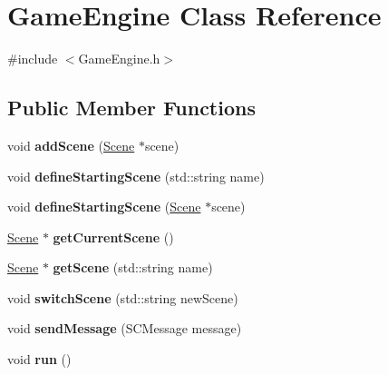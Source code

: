 \hypertarget{class_game_engine}{}\section{Game\+Engine Class Reference}
\label{class_game_engine}


{\ttfamily \#include $<$Game\+Engine.\+h$>$}

\subsection*{Public Member Functions}
\begin{DoxyCompactItemize}
\item 
\hypertarget{class_game_engine_a5505704cb9ba58c5d029d8a736eff73d}{}\label{class_game_engine_a5505704cb9ba58c5d029d8a736eff73d} 
void {\bfseries add\+Scene} (\hyperlink{class_scene}{Scene} $\ast$scene)
\item 
\hypertarget{class_game_engine_aba1c35007c56a3082102f67c08ea5580}{}\label{class_game_engine_aba1c35007c56a3082102f67c08ea5580} 
void {\bfseries define\+Starting\+Scene} (std\+::string name)
\item 
\hypertarget{class_game_engine_ad2bb379da2ce51978a989de4ca979ecb}{}\label{class_game_engine_ad2bb379da2ce51978a989de4ca979ecb} 
void {\bfseries define\+Starting\+Scene} (\hyperlink{class_scene}{Scene} $\ast$scene)
\item 
\hypertarget{class_game_engine_a8116aae790eaf236907d5d75401cd628}{}\label{class_game_engine_a8116aae790eaf236907d5d75401cd628} 
\hyperlink{class_scene}{Scene} $\ast$ {\bfseries get\+Current\+Scene} ()
\item 
\hypertarget{class_game_engine_ac70d59f0de33c34f84863a550408a476}{}\label{class_game_engine_ac70d59f0de33c34f84863a550408a476} 
\hyperlink{class_scene}{Scene} $\ast$ {\bfseries get\+Scene} (std\+::string name)
\item 
\hypertarget{class_game_engine_a000c4cc070830d727f349b094ab402e3}{}\label{class_game_engine_a000c4cc070830d727f349b094ab402e3} 
void {\bfseries switch\+Scene} (std\+::string new\+Scene)
\item 
\hypertarget{class_game_engine_aef45d9ee461773587e266c57783de1a3}{}\label{class_game_engine_aef45d9ee461773587e266c57783de1a3} 
void {\bfseries send\+Message} (S\+C\+Message message)
\item 
\hypertarget{class_game_engine_ab01970da2c68fefbf48b98c59d5627ae}{}\label{class_game_engine_ab01970da2c68fefbf48b98c59d5627ae} 
void {\bfseries run} ()
\item 

\end{DoxyCompactItemize}
